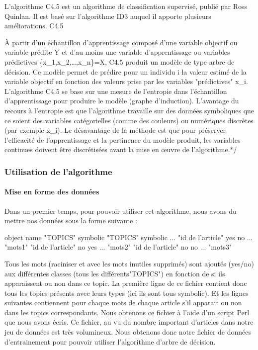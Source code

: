 L’algorithme C4.5 est un algorithme de classification supervisé, publié par Ross Quinlan. Il est basé sur l'algorithme ID3 auquel il apporte plusieurs améliorations.
C4.5

À partir d'un échantillon d'apprentissage composé d'une variable objectif ou variable prédite Y et d'au moins une variable d'apprentissage ou variables prédictives \{x_1,x_2,\ldots,x_n\}=X, C4.5 produit un modèle de type arbre de décision. Ce modèle permet de prédire pour un individu i la valeur estimé  de la variable objectif en fonction des valeurs prise par les variables "prédictives" x_i. L'algorithme C4.5 se base sur une mesure de l'entropie dans l'échantillon d'apprentissage pour produire le modèle (graphe d'induction). L'avantage du recours à l'entropie est que l'algorithme travaille sur des données symboliques que ce soient des variables catégorielles (comme des couleurs) ou numériques discrètes (par exemple x_{i}\in {}). Le désavantage de la méthode est que pour préserver l'efficacité de l'apprentissage et la pertinence du modèle produit, les variables continues doivent être discrétisées avant la mise en œuvre de l'algorithme.*/



\subsubsection{Utilisation de l'algorithme}
\paragraph{Mise en forme des données}  
Dans un premier temps, pour pouvoir utiliser cet algorithme, nous avons du mettre nos données sous la forme suivante :

object name "TOPICS" symbolic "TOPICS" symbolic ... 
"id de l'article" yes no ... "mots1"
"id de l'article" no yes ... "mots2"
"id de l'article" no no ... "mots3"

Tous les mots (raciniser et avec les mots inutiles supprimés) sont ajoutés (yes/no) aux différentes classes (tous les différents"TOPICS") en fonction de si ils apparaissent ou non dans ce topic.
La première ligne de ce fichier contient donc tous les topics présents avec leurs types (ici ils sont tous symbolic). Et les lignes suivantes contiennent pour chaque mots de chaque article s'il apparait ou non dans les topics correspondants.
Nous obtenons ce fichier à l'aide d'un script Perl que nous avons écris. Ce fichier, au vu du nombre important d'articles dans notre jeu de données est très volumineux. Nous obtenons donc notre fichier de données d'entrainement pour pouvoir utiliser l'algorithme d'arbre de décision. 

